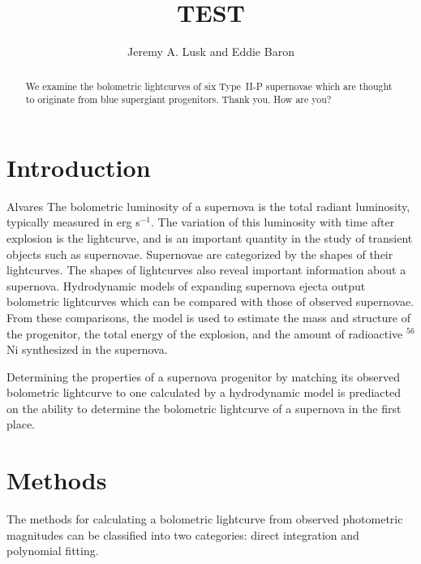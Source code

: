 \documentclass[apj]{emulateapj}
\begin{document}
\title{TEST}
\author{Jeremy A. Lusk and Eddie Baron} 


\begin{abstract}
We examine the bolometric lightcurves of six Type~II-P supernovae which are thought to originate from blue supergiant progenitors. Thank you. How are you?

\end{abstract}

\section{Introduction}

Alvares The bolometric luminosity of a supernova is the total radiant luminosity, typically measured in erg s$^{-1}$.
The variation of this luminosity with time after explosion is the lightcurve, and is an important quantity in the study of transient objects such as supernovae.
Supernovae are categorized by the shapes of their lightcurves. %
The shapes of lightcurves also reveal important information about a supernova.
Hydrodynamic models of expanding supernova ejecta output bolometric lightcurves which can be compared with those of observed supernovae.
From these comparisons, the model is used to estimate the mass and structure of the progenitor, the total energy of the explosion, and the amount of radioactive $^{56}$Ni synthesized in the supernova.

Determining the properties of a supernova progenitor by matching its observed bolometric lightcurve to one calculated by a hydrodynamic model is prediacted on the ability to determine the bolometric lightcurve of a supernova in the first place.

\section{Methods}

The methods for calculating a bolometric lightcurve from observed photometric magnitudes can be classified into two categories: direct integration and polynomial fitting.
\end{document}
